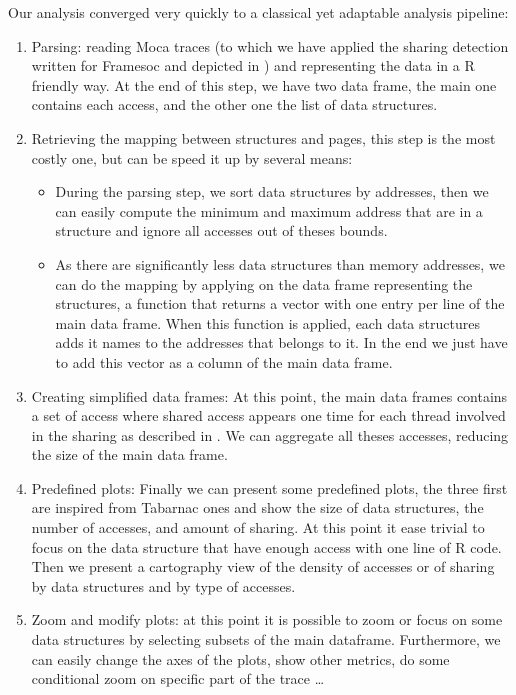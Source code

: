 Our analysis converged very quickly to a classical yet adaptable analysis pipeline:
\begin{enumerate}
    \item Parsing: reading \gls{Moca} traces (to which we have applied the sharing detection written for \gls{Framesoc} and depicted in )
        and representing the data in a \gls{R} friendly way. At the end of this step, we have two data frame, the main one contains each access, and the other one the list of data structures.
    \item Retrieving the mapping between structures and pages, this step is the most costly one, but can be speed it up by several means:
        \begin{itemize}
            \item During the parsing step, we sort data structures by addresses, then we can easily compute the minimum and maximum address that are in a structure and ignore all accesses out of theses bounds.
            \item As there are significantly less data structures than memory addresses, we can do the mapping by applying on the data frame representing the structures, a function that returns a vector with one entry per line of the main data frame.
                When this function is applied, each data structures adds it names to the addresses that belongs to it.
                In the end we just have to add this vector as a column of the main data frame.
        \end{itemize}
    \item Creating simplified data frames: At this point, the main data frames contains a set of access where shared access appears one time for each thread involved in the sharing as described in . We can aggregate all theses accesses, reducing the size of the main data frame.
    \item Predefined plots: Finally we can present some predefined  plots, the three first are inspired from \gls{Tabarnac} ones and show the size of data structures, the number of accesses, and amount of sharing.
        At this point it ease trivial to focus on the data structure that have enough access with one line of \gls{R} code.
        Then we present a cartography view of the density of accesses or of sharing by data structures and by type of accesses.
    \item Zoom and modify plots: at this point it is possible to zoom or focus on some data structures by selecting subsets of the main dataframe.
        Furthermore, we can easily change the axes of the plots, show other metrics, do some conditional zoom on specific part of the trace \ldots
\end{enumerate}

